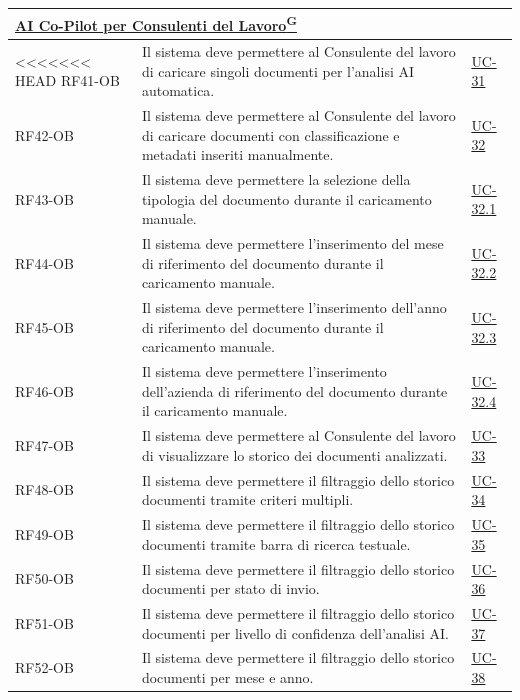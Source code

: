 ﻿\documentclass[a4paper,12pt]{article}
\providecommand{\glslink}[2]{\href{https://alittlebyte-19.github.io/Documentazione/glossario.html\#gls-#1}{\underline{#2}\textsuperscript{\scriptsize G}}}
\begin{document}
\begin{description}[style=multiline, leftmargin=4cm, font=\bfseries]
\begin{enumerate}[leftmargin=*, nosep]
{\begin{longtable}{|p{2.5cm}|p{9.5cm}|p{3.5cm}|}
    \multicolumn{3}{|l|}{\cellcolor{gray!12}\textbf{\glslink{ai-co-pilot-per-consulenti-del-lavoro-cdl}{AI Co-Pilot per Consulenti del Lavoro}}} \\
    \hline
<<<<<<< HEAD
    RF41-OB & Il sistema deve permettere al Consulente del lavoro di caricare singoli documenti per l'analisi AI automatica. & \hyperref[fig:uc-31]{UC-31} \\
    \hline
    RF42-OB & Il sistema deve permettere al Consulente del lavoro di caricare documenti con classificazione e metadati inseriti manualmente. & \hyperref[fig:uc-32]{UC-32} \\
    \hline
    RF43-OB & Il sistema deve permettere la selezione della tipologia del documento durante il caricamento manuale. & \hyperref[fig:uc-32.1]{UC-32.1} \\
    \hline
    RF44-OB & Il sistema deve permettere l'inserimento del mese di riferimento del documento durante il caricamento manuale. & \hyperref[fig:uc-32.2]{UC-32.2} \\
    \hline
    RF45-OB & Il sistema deve permettere l'inserimento dell'anno di riferimento del documento durante il caricamento manuale. & \hyperref[fig:uc-32.3]{UC-32.3} \\
    \hline
    RF46-OB & Il sistema deve permettere l'inserimento dell'azienda di riferimento del documento durante il caricamento manuale. & \hyperref[fig:uc-32.4]{UC-32.4} \\
    \hline
    RF47-OB & Il sistema deve permettere al Consulente del lavoro di visualizzare lo storico dei documenti analizzati. & \hyperref[fig:uc-33]{UC-33} \\
    \hline
    RF48-OB & Il sistema deve permettere il filtraggio dello storico documenti tramite criteri multipli. & \hyperref[fig:uc-34]{UC-34} \\
    \hline
    RF49-OB & Il sistema deve permettere il filtraggio dello storico documenti tramite barra di ricerca testuale. & \hyperref[fig:uc-35]{UC-35} \\
    \hline
    RF50-OB & Il sistema deve permettere il filtraggio dello storico documenti per stato di invio. & \hyperref[fig:uc-36]{UC-36} \\
    \hline
    RF51-OB & Il sistema deve permettere il filtraggio dello storico documenti per livello di confidenza dell'analisi AI. & \hyperref[fig:uc-37]{UC-37} \\
    \hline
    RF52-OB & Il sistema deve permettere il filtraggio dello storico documenti per mese e anno. & \hyperref[fig:uc-38]{UC-38} \\

\end{longtable}}
\end{enumerate}
\end{description}
\end{document}
